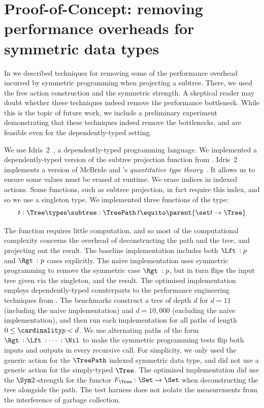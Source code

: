 \section{Proof-of-Concept: removing performance overheads for symmetric data types}

In  we described techniques for removing
some of the performance overhead incurred by symmetric programming
when projecting a subtree. There, we used the free action construction
and the symmetric strength. A skeptical reader may doubt whether these
techniques indeed remove the performance bottleneck. While this is the
topic of future work, we include a preliminary experiment
demonstrating that these techniques indeed remove the bottlenecks, and
are feasible even for the dependently-typed setting.

We use Idris~2~\cite{DBLP:conf/ecoop/Brady21}, a dependently-typed
programming language. We implemented a dependently-typed version of
the subtree projection function from .
Idris~2 implements a version of McBride and
\citeauthor{atkey:quantitative-type-theory}'s \emph{quantitative type
theory}~\cite{atkey:quantitative-type-theory}. It allows us to ensure
some values must be erased at runtime. We erase indices in
indexed actions. Some functions, such as subtree projection, in fact
require this index, and so we use a singleton type. We implemented
three functions of the type:
\[
t : \Tree \types
\subtree : \TreePath\, t \equito \parent{\set t \to \Tree}
\]

The function requires little computation, and so most of the
computational complexity concerns the overhead of deconstructing the
path and the tree, and projecting out the result. The baseline
implementation includes both $\Lft\::p$ and $\Rgt\:: p$ cases
explicitly.  The naive implementation uses symmetric programming to
remove the symmetric case $\Rgt\:: p$, but in turn flips the input
tree given via the singleton, and the result. The optimised
implementation employs dependently-typed counterparts to the
performance engineering techniques from .  The benchmarks construct a tree of depth $d$ for
$d=11$ (including the naive implementation) and $d=10,000$ (excluding
the naive implementation), and then run each implementation for all
paths of length $0 \leq \cardinality p < d$. We use alternating paths
of the form $\Rgt\:: \Lft\:: \cdots \:: \Nil$ to make the symmetric
programming tests flip both inputs and outputs in every recursive
call. For simplicity, we only used the generic action for the
$\TreePath$ indexed symmetric data type, and did not use a generic
action for the simply-typed $\Tree$. The optimised implementation did
use the $\Sym2$-strength for the functor $F_{\Tree} : \Set \to \Set$
when deconstructing the tree alongside the path. The test harness does not
isolate the measurements from the interference of garbage collection.


